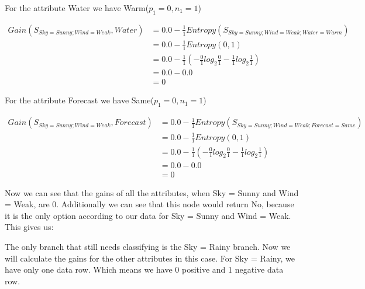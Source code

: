 \documentclass[10pt,a4paper]{article}
\begin{document}
{{{{{{{{{{For the attribute Water we have Warm($p_1=0,n_1=1$)
 
\begin{equation}
\begin{split}
Gain(S_{Sky=Sunny;Wind=Weak},Water) &= 0.0 - \frac{1}{1} Entropy(S_{Sky=Sunny;Wind=Weak;Water=Warm} )\\
          &= 0.0 - \frac{1}{1} Entropy(0,1) \\
          &= 0.0 - \frac{1}{1}( -\frac{0}{1} log_2\frac{0}{1} -\frac{1}{1} log_2\frac{1}{1} ) \\
          &= 0.0 - 0.0  \\
          &= 0
\end{split}
\end{equation}

For the attribute Forecast we have Same($p_1=0,n_1=1$)
 
\begin{equation}
\begin{split}
Gain(S_{Sky=Sunny;Wind=Weak},Forecast) &= 0.0 - \frac{1}{1} Entropy(S_{Sky=Sunny;Wind=Weak;Forecast=Same} )\\
          &= 0.0 - \frac{1}{1} Entropy(0,1) \\
          &= 0.0 - \frac{1}{1}( -\frac{0}{1} log_2\frac{0}{1} -\frac{1}{1} log_2\frac{1}{1} ) \\
          &= 0.0 - 0.0  \\
          &= 0
\end{split}
\end{equation}

Now we can see that the gains of all the attributes, when Sky = Sunny and Wind = Weak, are 0. Additionally we can see that this node would return No, because it is the only option according to our data for Sky = Sunny and Wind = Weak. This gives us:


The only branch that still needs classifying is the Sky = Rainy branch. Now we will calculate the gains for the other attributes in this case. For Sky = Rainy, we have only one data row. Which means we have 0 positive and 1 negative data row.

}}}}}}}}}}
\end{document}
